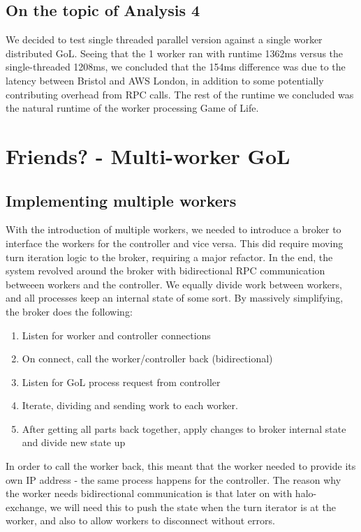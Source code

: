 \documentclass[twoside,twocolumn]{article}
\begin{document}
\subsection{On the topic of Analysis 4}
We decided to test single threaded parallel version against a single worker distributed GoL. Seeing that the 1 worker ran with
runtime 1362ms versus the single-threaded 1208ms, we concluded that the 154ms difference was due to the latency between Bristol
and AWS London, in addition to some potentially contributing overhead from RPC calls. The rest of the runtime we concluded was the natural
runtime of the worker processing Game of Life. 

\section{Friends? - Multi-worker GoL}
\subsection{Implementing multiple workers}
With the introduction of multiple workers, we needed to introduce a broker to interface the workers for the controller
and vice versa. This did require moving turn iteration logic to the broker, requiring a major refactor. In the end, the system
revolved around the broker with bidirectional RPC communication betweeen workers and the controller. We equally divide work
between workers, and all processes keep an internal state of some sort. By massively simplifying, the broker does the following:

\begin{enumerate}[noitemsep]
  \item Listen for worker and controller connections
  \item On connect, call the worker/controller back (bidirectional)
  \item Listen for GoL process request from controller
  \item Iterate, dividing and sending work to each worker.
  \item After getting all parts back together, apply changes to broker internal state and divide new state up
\end{enumerate}
In order to call the worker back, this meant that the worker needed to provide its own IP address - the same 
process happens for the controller. The reason why the worker needs bidirectional communication is that later on with halo-exchange,
we will need this to push the state when the turn iterator is at the worker, and also to allow workers to disconnect 
without errors.
\end{document}
